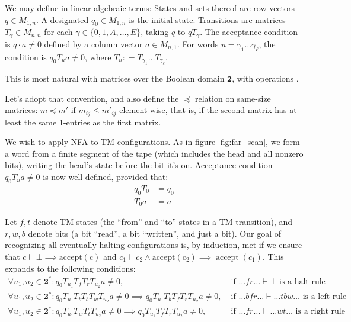 We may define   in linear-algebraic terms:
States and sets thereof are row vectors $q\in M_{1,n}$.
A designated $q_0\in M_{1,n}$ is the initial state.
Transitions are matrices $T_\gamma\in M_{n,n}$ for each $\gamma\in\{0,1,A,\ldots,E\}$, taking $q$ to $qT_\gamma$.
The acceptance condition is $q\cdot a\ne 0$ defined by a column vector $a\in M_{n,1}$.
For words $u=\gamma_1\dots\gamma_\ell$, the condition is $q_0 T_u a\ne 0$, where $T_u\mathrel{\mathop:}=T_{\gamma_1}\dots T_{\gamma_\ell}$.

This is most natural with matrices over the Boolean domain $\mathbf{2}$, with operations .

Let's adopt that convention, and also define the $\preceq$ relation on same-size matrices: $m\preceq m'$ if $m_{ij}\le m'_{ij}$ element-wise,
that is, if the second matrix has at least the same 1-entries as the first matrix.

We wish to apply  NFA to TM configurations.
As in figure \ref{fig:far_scan}, we form a word from a finite segment of the tape (which includes the head and all nonzero bits), writing the head's state before the bit it's on.
Acceptance condition $q_0 T_u a\ne 0$ is now well-defined, provided that:
\begin{align}
  q_0 T_0 &= q_0
  \label{far-cond-leading-0}
  \\
  T_0 a &= a
  \label{far-cond-trailing-0}
\end{align}

Let $f,t$ denote TM states (the ``from'' and ``to'' states in a TM transition), and $r,w,b$ denote bits (a bit ``read'', a bit ``written'', and just a bit).
Our goal of recognizing all eventually-halting configurations is, by induction, met if we ensure that $c\vdash\bot\implies\operatorname{accept(c)}$
and $c_1\vdash c_2\land\operatorname{accept(c_2)}\implies\operatorname{accept}(c_1)$.
This expands to the following conditions:
\begin{align*}
  \forall u_1,u_2\in\mathbf{2}^*: q_0 T_{u_1} T_f T_r T_{u_2} a \ne 0,\;& \text{if $\ldots fr\ldots\vdash\bot$ is a halt rule}
  \\
  \forall u_1,u_2\in\mathbf{2}^*: q_0 T_{u_1} T_t T_b T_w T_{u_2} a \ne 0 \implies q_0 T_{u_1} T_b T_f T_r T_{u_2} a \ne 0,\;& \text{if $\ldots bfr\ldots\vdash\ldots tbw\ldots$ is a left rule}
  \\
  \forall u_1,u_2\in\mathbf{2}^*: q_0 T_{u_1} T_w T_t T_{u_2} a \ne 0 \implies q_0 T_{u_1} T_f T_r T_{u_2} a \ne 0,\;& \text{if $\ldots fr\ldots\vdash\ldots wt\ldots$ is a right rule}
\end{align*}

